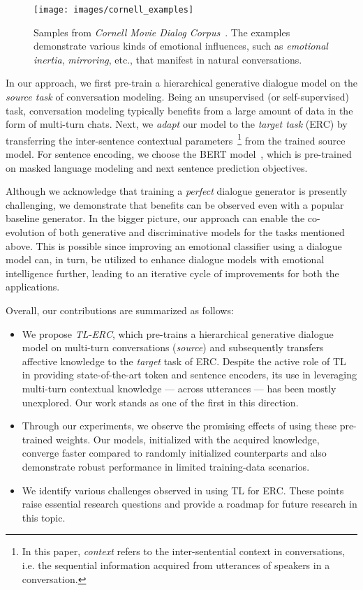 \documentclass[preprint,3pt]{elsarticle}
\begin{document}
\begin{figure*}[t]
	\centering
	\texttt{[image: images/cornell\_examples]}
	\caption{\footnotesize{Samples from \textit{Cornell Movie Dialog Corpus}~\cite{danescu2011chameleons}. The examples demonstrate various kinds of emotional influences, such as \textit{emotional inertia}, \textit{mirroring}, etc., that manifest in natural conversations. }}
	\label{fig:examples}
\end{figure*}


In our approach, we first pre-train a hierarchical generative dialogue model on the \textit{source task} of conversation modeling. Being an unsupervised (or self-supervised) task, conversation modeling typically benefits from a large amount of data in the form of multi-turn chats. Next, we \textit{adapt} our model to the \textit{target task} (ERC) by transferring the inter-sentence contextual parameters~\footnote{In this paper, \textit{context} refers to the inter-sentential context in conversations, i.e. the sequential information acquired from utterances of speakers in a conversation.} from the trained source model. For sentence encoding, we choose the BERT model~\cite{devlin2018bert}, which is pre-trained on masked language modeling and next sentence prediction objectives.

Although we acknowledge that training a \textit{perfect} dialogue generator is presently challenging, we demonstrate that benefits can be observed even with a popular baseline generator. In the bigger picture, our approach can enable the co-evolution of both generative and discriminative models for the tasks mentioned above. This is possible since improving an emotional classifier using a dialogue model can, in turn, be utilized to enhance dialogue models with emotional intelligence further, leading to an iterative cycle of improvements for both the applications.

Overall, our contributions are summarized as follows:

\begin{itemize}
	\item We propose \textit{TL-ERC}, which pre-trains a hierarchical generative dialogue model on multi-turn conversations (\textit{source}) and subsequently transfers affective knowledge to the \textit{target} task of ERC. Despite the active role of TL in providing state-of-the-art token and sentence encoders, its use in leveraging multi-turn contextual knowledge --- across utterances --- has been mostly unexplored. Our work stands as one of the first in this direction.
    \item Through our experiments, we observe the promising effects of using these pre-trained weights. Our models, initialized with the acquired knowledge, converge faster compared to randomly initialized counterparts and also demonstrate robust performance in limited training-data scenarios.
    \item We identify various challenges observed in using TL for ERC. These points raise essential research questions and provide a roadmap for future research in this topic.
\end{itemize}
\end{document}
